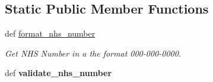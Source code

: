 \subsection*{Static Public Member Functions}
\begin{DoxyCompactItemize}
\item 
\hypertarget{classstore_1_1_store_1_1_patient_ab4c7a67cbca4e6810a537964a88fd326}{def \hyperlink{classstore_1_1_store_1_1_patient_ab4c7a67cbca4e6810a537964a88fd326}{format\-\_\-nhs\-\_\-number}}\label{classstore_1_1_store_1_1_patient_ab4c7a67cbca4e6810a537964a88fd326}

\begin{DoxyCompactList}\small\item\em Get N\-H\-S Number in a the format 000-\/000-\/0000. \end{DoxyCompactList}\item 
\hypertarget{classstore_1_1_store_1_1_patient_a33925c8fd37fcda8394f2fc819b4c397}{def {\bfseries validate\-\_\-nhs\-\_\-number}}\label{classstore_1_1_store_1_1_patient_a33925c8fd37fcda8394f2fc819b4c397}

\end{DoxyCompactItemize}
